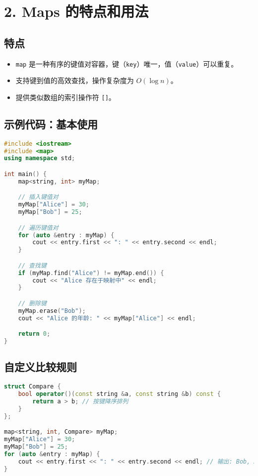 \documentclass[a4paper,12pt]{article}
\begin{document}
\section*{2. Maps 的特点和用法}

\subsection*{特点}
\begin{itemize}
    \item \texttt{map} 是一种有序的键值对容器，键（\texttt{key}）唯一，值（\texttt{value}）可以重复。
    \item 支持键到值的高效查找，操作复杂度为 $O(\log n)$。
    \item 提供类似数组的索引操作符 \texttt{[]}。
\end{itemize}

\subsection*{示例代码：基本使用}
\begin{lstlisting}[language=C++, caption=Map 示例]
#include <iostream>
#include <map>
using namespace std;

int main() {
    map<string, int> myMap;

    // 插入键值对
    myMap["Alice"] = 30;
    myMap["Bob"] = 25;

    // 遍历键值对
    for (auto &entry : myMap) {
        cout << entry.first << ": " << entry.second << endl;
    }

    // 查找键
    if (myMap.find("Alice") != myMap.end()) {
        cout << "Alice 存在于映射中" << endl;
    }

    // 删除键
    myMap.erase("Bob");
    cout << "Alice 的年龄: " << myMap["Alice"] << endl;

    return 0;
}
\end{lstlisting}

\subsection*{自定义比较规则}
\begin{lstlisting}[language=C++, caption=Map 自定义排序]
struct Compare {
    bool operator()(const string &a, const string &b) const {
        return a > b; // 按键降序排列
    }
};

map<string, int, Compare> myMap;
myMap["Alice"] = 30;
myMap["Bob"] = 25;
for (auto &entry : myMap) {
    cout << entry.first << ": " << entry.second << endl; // 输出: Bob, Alice
}
\end{lstlisting}
\end{document}
